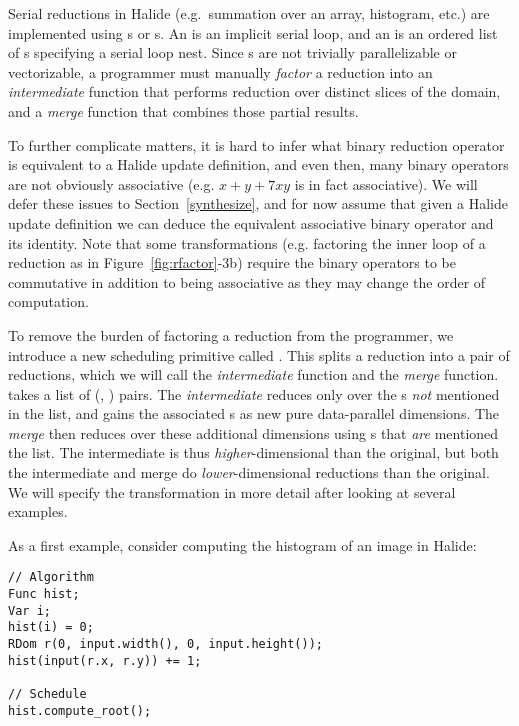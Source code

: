Serial reductions in Halide (e.g.\ summation over an array, histogram, etc.) are implemented using s or s. An  is an implicit serial loop, and an  is an ordered list of s specifying a serial loop nest. Since s are not trivially parallelizable or vectorizable, a programmer must manually \emph{factor} a reduction into an \emph{intermediate} function that performs reduction over distinct slices of the domain, and a \emph{merge} function that combines those partial results.

To further complicate matters, it is hard to infer what binary reduction operator is equivalent to a Halide update definition, and even then, many binary operators are not obviously associative (e.g. $x + y + 7xy$ is in fact associative). We will defer these issues to Section~\ref{synthesize}, and for now assume that given a Halide update definition we can deduce the equivalent associative binary operator and its identity. Note that some transformations (e.g. factoring the inner loop of a reduction as in Figure~\ref{fig:rfactor}-3b) require the binary operators to be commutative in addition to being associative as they may change the order of computation.

To remove the burden of factoring a reduction from the programmer, we introduce a new scheduling primitive called . This splits a reduction into a pair of reductions, which we will call the \emph{intermediate} function and the \emph{merge} function.  takes a list of (, ) pairs. The \emph{intermediate} reduces only over the s \emph{not} mentioned in the list, and gains the associated s as new pure data-parallel dimensions. The \emph{merge} then reduces over these additional dimensions using s that \emph{are} mentioned the list. The intermediate is thus \emph{higher}-dimensional than the original, but both the intermediate and merge do \emph{lower}-dimensional reductions than the original. We will specify the transformation in more detail after looking at several examples.

As a first example, consider computing the histogram of an image in Halide:

\noindent
\begin{minipage}{\linewidth}
\begin{lstlisting}
// Algorithm
Func hist;
Var i;
hist(i) = 0;
RDom r(0, input.width(), 0, input.height());
hist(input(r.x, r.y)) += 1;

// Schedule
hist.compute_root();
\end{lstlisting}
\end{minipage}

